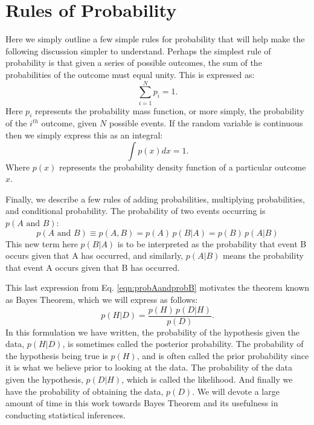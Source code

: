 \section{Rules of Probability}
Here we simply outline a few simple rules for probability that will help make the following discussion simpler to understand. Perhaps the simplest rule of probability is that given a series of possible outcomes, the sum of the probabilities of the outcome must equal unity. This is expressed as:
\begin{equation}\label{eqn:probsumdiscrete}
    \sum_{i=1}^{N} p_i = 1.
\end{equation}
Here $p_i$ represents the probability mass function, or more simply, the probability of the \textit{$i^{th}$} outcome, given $N$ possible events. If the random variable is continuous then we simply express this as an integral:
\begin{equation}\label{eqn:probsumcontinuous}
    \int p \left( x \right) dx = 1.
\end{equation}
Where $p(x)$ represents the probability density function of a particular outcome $x$.

Finally, we describe a few rules of adding probabilities, multiplying probabilities, and conditional probability. The probability of two events occurring is $p(A \textrm{ and } B)$:
\begin{equation}\label{eqn:probAandprobB}
    p\left(A\textrm{ and }B\right) \equiv p(A,B) = p(A) \, p(B|A) = p(B) \, p(A|B)
\end{equation}
This new term here $p(B|A)$ is to be interpreted as the probability that event B occurs given that A has occurred, and similarly, $p(A|B)$ means the probability that event A occurs given that B has occurred.

This last expression from Eq. \ref{eqn:probAandprobB} motivates the theorem known as Bayes Theorem, which we will express as follows:
\begin{equation} \label{eqn:BayesTheorem_basic}
     p(H|D) = \frac{p(H) \, p(D|H)}{p(D)}.
\end{equation}
In this formulation we have written, the probability of the hypothesis given the data, $p(H|D)$, is sometimes called the posterior probability. The probability of the hypothesis being true is $p(H)$, and is often called the prior probability since it is what we believe prior to looking at the data. The probability of the data given the hypothesis, $p(D|H)$, which is called the likelihood. And finally we have the probability of obtaining the data, $p(D)$. We will devote a large amount of time in this work towards Bayes Theorem and its usefulness in conducting statistical inferences. 


